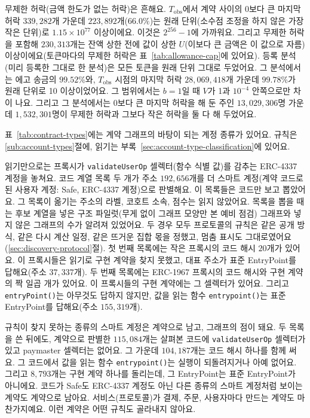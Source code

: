 무제한 허락(금액 한도가 없는 허락)은 흔해요. $T_{\mathrm{obs}}$에서 계약 사이의 0보다 큰 마지막 허락 $339{,}282$개 가운데 $223{,}892$개($66.0\%$)는 원래 단위(소수점 조정을 하지 않은 가장 작은 단위)로 $1.15\times10^{77}$ 이상이에요. 이것은 $2^{256}-1$에 가까워요. 그리고 무제한 허락을 포함해 $230{,}313$개는 잔액 상한 전에 값이 상한 $U$(이보다 큰 금액은 이 값으로 자름) 이상이에요(토큰마다의 무제한 허락은 표~\ref{tab:allowance-cap}에 있어요). 등록 분석(미리 등록한 그대로 한 분석)은 모든 토큰을 원래 단위 그대로 두었어요. 그 분석에서는 에고 송금의 $99.52\%$와, $T_{\mathrm{obs}}$ 시점의 마지막 허락 $28{,}069{,}418$개 가운데 $99.78\%$가 원래 단위로 10 이상이었어요. 그 범위에서는 $b=1$일 때 $V$가 1과 $10^{-4}$ 안쪽으로만 차이 나요. 그리고 그 분석에서는 0보다 큰 마지막 허락을 해 둔 주인 $13{,}029{,}306$명 가운데 $1{,}532{,}301$명이 무제한 허락과 그보다 작은 허락을 둘 다 해 두었어요.


표~\ref{tab:contract-types}에는 계약 그래프의 바탕이 되는 계정 종류가 있어요. 규칙은 \ref{sub:account-types}절에, 읽기는 부록~\ref{sec:account-type-classification}에 있어요.



읽기만으로는 프록시가 \texttt{validateUserOp} 셀렉터(함수 식별 값)를 감추는 ERC-4337 계정을 놓쳐요. 코드 계열 목록 두 개가 주소 $192{,}656$개를 더 스마트 계정(계약 코드로 된 사용자 계정: Safe, ERC-4337 계정)으로 판별해요. 이 목록들은 코드만 보고 뽑았어요. 그 목록이 옮기는 주소의 라벨, 코호트 소속, 점수는 읽지 않았어요. 목록을 뽑을 때는 후보 계열을 넣은 구조 파일럿(무게 없이 그래프 모양만 본 예비 점검) 그래프와 넣지 않은 그래프의 수가 알려져 있었어요. 두 경우 모두 프로토콜의 규칙은 같은 공개 방식, 같은 다시 계산 일정, 같은 뜨거운 집합 몫을 정했고, 멈춤 표시도 그대로였어요(\ref{sec:discovery-protocol}절). 첫 번째 목록에는 작은 프록시의 코드 해시 $20$개가 있어요. 이 프록시들은 읽기로 구현 계약을 찾지 못했고, 대표 주소가 표준 EntryPoint를 답해요(주소 $37{,}337$개). 두 번째 목록에는 ERC-1967 프록시의 코드 해시와 구현 계약의 짝 일곱 개가 있어요. 이 프록시들의 구현 계약에는 그 셀렉터가 있어요. 그리고 \texttt{entryPoint()}는 아무것도 답하지 않지만, 값을 읽는 함수 \texttt{entrypoint()}는 표준 EntryPoint를 답해요(주소 $155{,}319$개).

규칙이 찾지 못하는 종류의 스마트 계정은 계약으로 남고, 그래프의 점이 돼요. 두 목록을 쓴 뒤에도, 계약으로 판별한 $115{,}084$개는 살펴본 코드에 \texttt{validateUserOp} 셀렉터가 있고 paymaster 셀렉터는 없어요. 그 가운데 $104{,}187$개는 코드 해시 하나를 함께 써요. 그 코드에서 값을 읽는 함수 \texttt{entrypoint()}는 실행이 되돌려지거나 아예 없어요. 그리고 $8{,}793$개는 구현 계약 하나를 돌리는데, 그 EntryPoint는 표준 EntryPoint가 아니에요. 코드가 Safe도 ERC-4337 계정도 아닌 다른 종류의 스마트 계정처럼 보이는 계약도 계약으로 남아요. 서비스(프로토콜)가 결제, 주문, 사용자마다 만드는 계약도 마찬가지예요. 이런 계약은 어떤 규칙도 골라내지 않아요.

